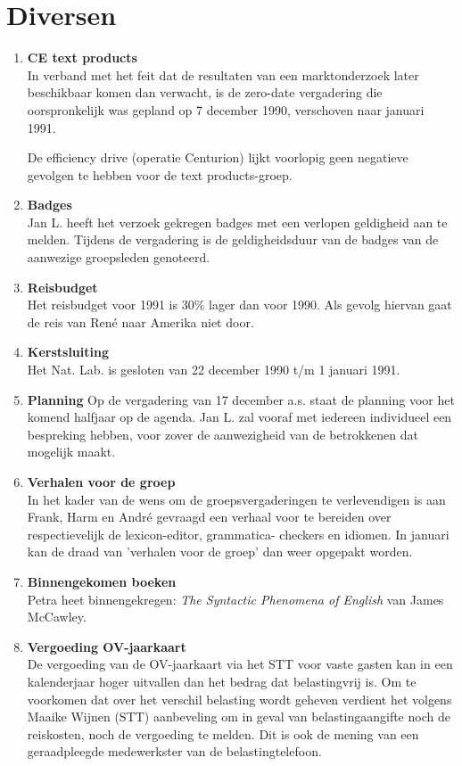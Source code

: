 \section{Diversen}
\begin{enumerate}
\item {\bf CE text products}\\
In verband met het feit dat de resultaten van een marktonderzoek
later beschikbaar komen dan verwacht, is de zero-date vergadering die
oorspronkelijk was gepland op 7 december 1990, 
verschoven naar januari 1991. 

De efficiency drive (operatie Centurion) 
lijkt voorlopig geen negatieve gevolgen te hebben voor 
de text products-groep.
\item {\bf Badges}\\
Jan L. heeft het verzoek gekregen badges met een verlopen geldigheid
aan te melden.
Tijdens de vergadering is de geldigheidsduur van de 
badges van de aanwezige groepsleden genoteerd.

\item {\bf Reisbudget}\\
Het reisbudget voor 1991 is 30\% lager dan voor 1990. Als gevolg hiervan 
gaat de reis van Ren\'{e} naar Amerika niet door.

\item {\bf Kerstsluiting}\\
Het Nat. Lab. is gesloten van 22 december 1990 t/m 1 januari 1991.
\item {\bf Planning}
Op de vergadering van 17 december a.s. staat de planning voor het komend 
halfjaar op de agenda. Jan L. zal vooraf  met iedereen 
individueel een bespreking hebben, voor  zover de aanwezigheid van de 
betrokkenen dat mogelijk maakt.

\item {\bf Verhalen voor de groep}\\
In het kader van de wens om de groepsvergaderingen te verlevendigen
is aan Frank, Harm en Andr\'{e} gevraagd 
een verhaal voor te bereiden over respectievelijk 
de lexicon-editor, grammatica-
checkers en idiomen. 
In januari kan  de draad van 'verhalen voor de groep' 
dan weer opgepakt worden. 

\item {\bf Binnengekomen boeken}\\
Petra heet binnengekregen: {\em The Syntactic Phenomena of English} van James 
McCawley. 

\item {\bf Vergoeding OV-jaarkaart}\\
De vergoeding van de OV-jaarkaart via het STT voor vaste gasten kan 
in een kalenderjaar hoger uitvallen dan het bedrag dat belastingvrij is.
Om 
te voorkomen dat over het verschil  belasting wordt geheven 
verdient het volgens Maaike Wijnen  (STT) 
aanbeveling om in geval van belastingaangifte 
noch de reiskosten, noch de vergoeding te melden. Dit is ook de mening 
van een geraadpleegde medewerkster van de belastingtelefoon. 

\end{enumerate}

